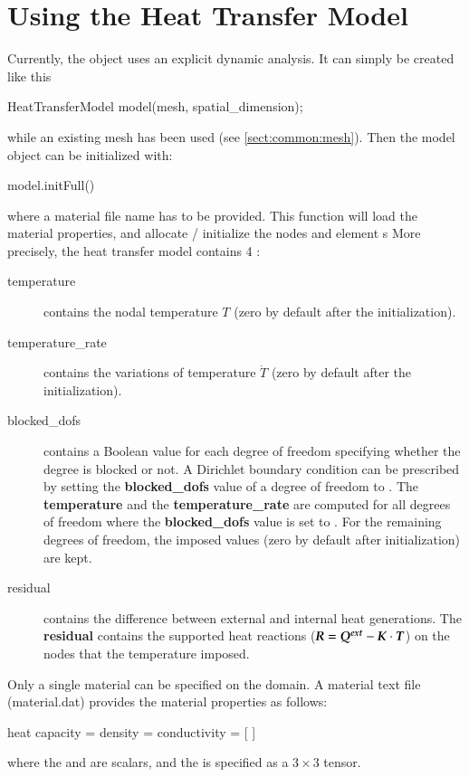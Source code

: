 \section{Using the Heat Transfer Model}
Currently, the  object uses an explicit dynamic analysis.
It can simply be created like this
\begin{cpp}
  HeatTransferModel model(mesh, spatial_dimension);
\end{cpp}
while an existing mesh has been used (see \ref{sect:common:mesh}).
Then the model object can be initialized with:
\begin{cpp}
  model.initFull()
\end{cpp}
where a material file name has to be provided. This function will load the material
properties, and allocate / initialize the nodes and element s
More precisely, the heat transfer model contains 4 :
\begin{description}
\item[temperature] contains the nodal temperature $T$ (zero  by   default  after  the
  initialization).
\item[temperature\_rate] contains the variations of temperature $\dot{T}$
  (zero  by   default  after  the
  initialization).

\item[blocked\_dofs] contains a Boolean value for each degree of
  freedom specifying whether the degree is blocked or not. A Dirichlet
  boundary condition can be prescribed by setting the
  \textbf{blocked\_dofs} value of a degree of freedom to .
  The \textbf{temperature} and the \textbf{temperature\_rate} are
  computed for all degrees of freedom where the \textbf{blocked\_dofs}
  value is set to .  For the remaining degrees of freedom,
  the imposed values (zero by default after initialization) are kept.

\item[residual] contains the difference between external and internal heat generations.
The \textbf{residual} contains the supported heat reactions ($\boldsymbol{R} = \boldsymbol{Q^{ext}} -\boldsymbol{K} \cdot \boldsymbol{T}$) on
  the nodes that the temperature imposed.
\end{description}

Only a single material can be specified on the domain.
A material text file (\eg material.dat) provides the material properties as follows:
\begin{cpp}
  heat %
  capacity = %
  density = %
  conductivity = [%
  ]
\end{cpp}
where the  and  are scalars, and the  is specified as a $3\times 3$ tensor.

